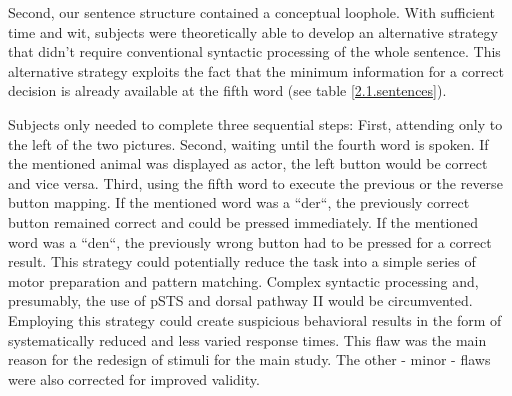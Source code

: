Second, our sentence structure contained a conceptual loophole.
With sufficient time and wit, subjects were theoretically able to develop an alternative strategy that didn't require conventional syntactic processing of the whole sentence.
This alternative strategy exploits the fact that the minimum information for a correct decision is already available at the fifth word (see table \ref{2.1.sentences}).

Subjects only needed to complete three sequential steps:
First, attending only to the left of the two pictures.
Second, waiting until the fourth word is spoken.
If the mentioned animal was displayed as actor, the left button would be correct and vice versa.
Third, using the fifth word to execute the previous or the reverse button mapping.
If the mentioned word was a ``der``, the previously correct button remained correct and could be pressed immediately.
If the mentioned word was a ``den``, the previously wrong button had to be pressed for a correct result.
This strategy could potentially reduce the task into a simple series of motor preparation and pattern matching.
Complex syntactic processing and, presumably, the use of pSTS and dorsal pathway II would be circumvented.
Employing this strategy could create suspicious behavioral results in the form of systematically reduced and less varied response times.
This flaw was the main reason for the redesign of stimuli for the main study.
The other - minor - flaws were also corrected for improved validity.
